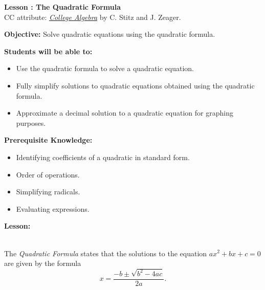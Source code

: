 \documentclass[12pt]{article}
\theoremstyle{definition}
\begin{document}
{\bf \large Lesson : The Quadratic Formula}\label{les:the_quadratic_formula}
\\ CC attribute: \href{http://www.stitz-zeager.com}{\it{College Algebra}} by C. Stitz and J. Zeager. 
\hfill \doclicenseImage[imagewidth=5em]\\
\par
{\bf Objective:} Solve quadratic equations using the quadratic formula.\\
\par
{\bf Students will be able to:}
\begin{itemize}
	\item Use the quadratic formula to solve a quadratic equation.
	\item Fully simplify solutions to quadratic equations obtained using the quadratic formula.
	\item Approximate a decimal solution to a quadratic equation for graphing purposes.
\end{itemize}
{\bf Prerequisite Knowledge:}
\begin{itemize}
	\item Identifying coefficients of a quadratic in standard form.
	\item Order of operations.
	\item Simplifying radicals.
	\item Evaluating expressions.
\end{itemize}
\hrulefill

{\bf Lesson:}\\
\ \par
The {\it Quadratic Formula} states that the solutions to the equation $ax^2+bx+c=0$ are given by the formula
$$x=\dfrac{-b\pm\sqrt{b^2-4ac}}{2a}.$$
  
\end{document}
